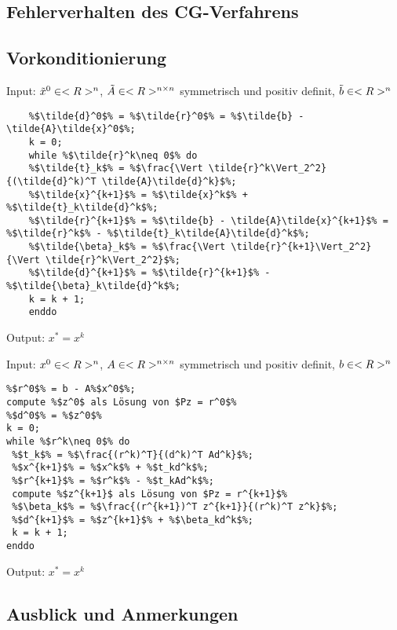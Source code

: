 \subsection{Fehlerverhalten des CG-Verfahrens}

\subsection{Vorkonditionierung}

\begin{algorithm}[CG-Verfahren für $\tilde{A}\tilde{x}=\tilde{b}$]
	Input: $\tilde{x}^0\in<R>^n$, $\tilde{A}\in<R>^{n \times n}$ symmetrisch und positiv definit, $\tilde{b}\in<R>^n$
	\begin{lstlisting}
	%$\tilde{d}^0$% = %$\tilde{r}^0$% = %$\tilde{b} - \tilde{A}\tilde{x}^0$%;
	k = 0;
	while %$\tilde{r}^k\neq 0$% do
	%$\tilde{t}_k$% = %$\frac{\Vert \tilde{r}^k\Vert_2^2}{(\tilde{d}^k)^T \tilde{A}\tilde{d}^k}$%;
	%$\tilde{x}^{k+1}$% = %$\tilde{x}^k$% + %$\tilde{t}_k\tilde{d}^k$%;
	%$\tilde{r}^{k+1}$% = %$\tilde{b} - \tilde{A}\tilde{x}^{k+1}$% = %$\tilde{r}^k$% - %$\tilde{t}_k\tilde{A}\tilde{d}^k$%;
	%$\tilde{\beta}_k$% = %$\frac{\Vert \tilde{r}^{k+1}\Vert_2^2}{\Vert \tilde{r}^k\Vert_2^2}$%;
	%$\tilde{d}^{k+1}$% = %$\tilde{r}^{k+1}$% - %$\tilde{\beta}_k\tilde{d}^k$%;
	k = k + 1;
	enddo
	\end{lstlisting}
	Output: $x^\ast=x^k$
\end{algorithm}

\begin{algorithm}
	Input: $x^0\in<R>^n$, $A\in<R>^{n \times n}$ symmetrisch und positiv definit, $b\in<R>^n$
	\begin{lstlisting}
%$r^0$% = b - A%$x^0$%;
compute %$z^0$ als Lösung von $Pz = r^0$% 
%$d^0$% = %$z^0$%
k = 0;
while %$r^k\neq 0$% do
 %$t_k$% = %$\frac{(r^k)^T}{(d^k)^T Ad^k}$%;
 %$x^{k+1}$% = %$x^k$% + %$t_kd^k$%;
 %$r^{k+1}$% = %$r^k$% - %$t_kAd^k$%;
 compute %$z^{k+1}$ als Lösung von $Pz = r^{k+1}$%
 %$\beta_k$% = %$\frac{(r^{k+1})^T z^{k+1}}{(r^k)^T z^k}$%;
 %$d^{k+1}$% = %$z^{k+1}$% + %$\beta_kd^k$%;
 k = k + 1;
enddo
	\end{lstlisting}
	Output: $x^\ast=x^k$
\end{algorithm}

\subsection{Ausblick und Anmerkungen}

